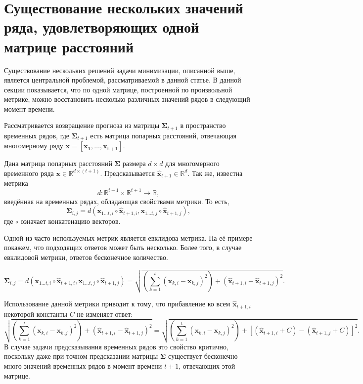 \documentclass{article}
\begin{document}
\section{Существование нескольких значений ряда, удовлетворяющих одной матрице расстояний}

Существование нескольких решений задачи минимизации, описанной выше, является центральной проблемой, рассматриваемой в данной статье. В данной секции показывается, что по одной матрице, построенной по произвольной метрике, можно восстановить несколько различных значений рядов в следующий момент времени.

Рассматривается возвращение прогноза из матрицы $\mathbf{\Sigma}_{t+1}$ в пространство временных рядов, где $\mathbf{\Sigma}_{t+1}$ есть матрица попарных расстояний, отвечающая многомерному ряду $\mathbf{x}=[\mathbf{x_1}, \ldots, \mathbf{x_{t+1}}]$.

Дана матрица попарных расстояний $\mathbf{\Sigma}$ размера $d \times d$ для многомерного временного ряда $\mathbf{x} \in \mathbb{R}^{d \times (t+1)}$. Предсказывается $\hat{\mathbf{x}}_{t+1} \in \mathbb{R}^d$. Так же, известна метрика \[ d : \mathbb{R}^{t+1} \times \mathbb{R}^{t+1} \rightarrow \mathbb{R}, \] введённая на временных рядах, обладающая свойствами метрики. То есть, \[\mathbf{\Sigma}_{i,j} = d(\mathbf{x}_{1 \ldots t, i} \circ \hat{\mathbf{x}}_{t+1, i}, \mathbf{x}_{1 \ldots t, j} \circ \hat{\mathbf{x}}_{t+1, j}),\] где $\circ$ означает конкатенацию векторов.

Одной из часто используемых метрик является евклидова метрика. На её примере покажем, что подходящих ответов может быть несколько. Более того, в случае евклидовой метрики, ответов бесконечное количество.

\[\mathbf{\Sigma}_{i,j} = d(\mathbf{x}_{1 \ldots t, i} \circ \hat{\mathbf{x}}_{t+1, i}, \mathbf{x}_{1 \ldots t, j} \circ \hat{\mathbf{x}}_{t+1, j})=\sqrt{\left(\sum_{k=1}^t (\mathbf{x}_{k,i}-\mathbf{x}_{k,j})^2\right) + (\hat{\mathbf{x}}_{t+1, i}-\hat{\mathbf{x}}_{t+1, j})^2}.\]

Использование данной метрики приводит к тому, что прибавление ко всем $\hat{\mathbf{x}}_{t+1, i}$ некоторой константы $C$ не изменяет ответ:
\[
\sqrt{\left(\sum_{k=1}^t (\mathbf{x}_{k,i}-\mathbf{x}_{k,j})^2\right) + (\hat{\mathbf{x}}_{t+1, i}-\hat{\mathbf{x}}_{t+1, j})^2} = \sqrt{\left(\sum_{k=1}^t (\mathbf{x}_{k,i}-\mathbf{x}_{k,j})^2\right) + [(\hat{\mathbf{x}}_{t+1, i} + C) -(\hat{\mathbf{x}}_{t+1, j} + C)]^2}.
\]
В случае задачи предсказывания временных рядов это свойство критично, поскольку даже при точном предсказании матрицы $\mathbf{\Sigma}$ существует бесконечно много значений временных рядов в момент времени $t+1$, отвечающих этой матрице.
\end{document}
